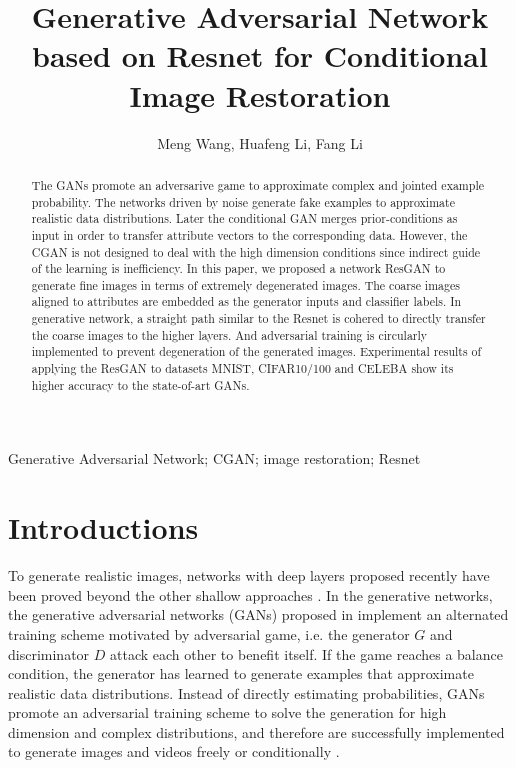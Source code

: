\documentclass[publish,JACIII,paper]{jaciiiarticle}
\begin{document}
\pagestyle{jaciiistyle}

\title{Generative Adversarial Network based on Resnet for Conditional Image Restoration}
\author{Meng Wang, Huafeng Li, Fang Li}
\address{Kunming University of Institute Technology, Information and Automatic College\\
         E-mail: vicong68@qq.com}
\maketitle

\begin{abstract}%
\noindent The GANs promote an adversarive game to approximate complex and jointed example probability.
The networks driven by noise generate fake examples to approximate realistic data distributions.
Later the conditional GAN merges prior-conditions as input in order to transfer attribute vectors to the corresponding data. 
However, the CGAN is not designed to deal with the high dimension conditions since indirect guide of the learning is inefficiency.
In this paper, we proposed a network ResGAN to generate fine images in terms of extremely degenerated images.
The coarse images aligned to attributes are embedded as the generator inputs and classifier labels. 
In generative network, a straight path similar to the Resnet is cohered to directly transfer the coarse images to the higher layers.
And adversarial training is circularly implemented to prevent degeneration of the generated images. 
Experimental results of applying the ResGAN to datasets MNIST, CIFAR10/100 and CELEBA show its higher accuracy to the state-of-art GANs.
\end{abstract}

\begin{keywords}
Generative Adversarial Network; CGAN; image restoration; Resnet 
\end{keywords}


\section{Introductions}
To generate realistic images, networks with deep layers proposed recently have been proved beyond the other shallow approaches \cite{Vincent2008,Radford2015}.   
In the generative networks, 
the generative adversarial networks (GANs) proposed in \cite{Goodfellow2014} implement an alternated training scheme motivated by adversarial game,
i.e. the generator $G$ and discriminator $D$ attack each other to benefit itself.
If the game reaches a balance condition, 
the generator has learned to generate examples that approximate realistic data distributions.
Instead of directly estimating probabilities, 
GANs promote an adversarial training scheme to solve the generation for high dimension and complex distributions,
and therefore are successfully implemented to generate images and videos freely or conditionally \cite{Mirza2014,yu2017seqgan}.   
\end{document}
